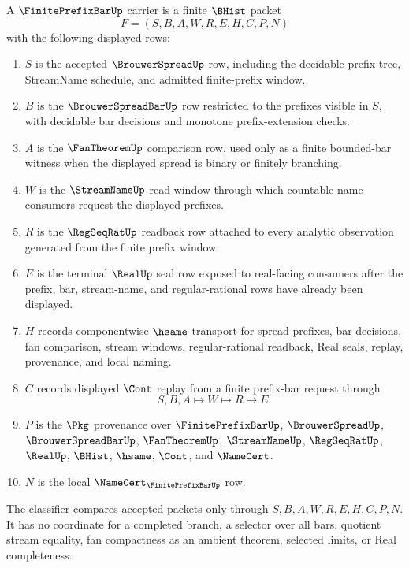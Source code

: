 \begin{definition}
\label{def:finite-prefix-bar-carrier}
A $\FinitePrefixBarUp$ carrier is a finite $\BHist$ packet
$$
F=(S,B,A,W,R,E,H,C,P,N)
$$
with the following displayed rows:
\begin{enumerate}
\item $S$ is the accepted $\BrouwerSpreadUp$ row, including the decidable prefix tree, StreamName schedule, and admitted finite-prefix window.
\item $B$ is the $\BrouwerSpreadBarUp$ row restricted to the prefixes visible in $S$, with decidable bar decisions and monotone prefix-extension checks.
\item $A$ is the $\FanTheoremUp$ comparison row, used only as a finite bounded-bar witness when the displayed spread is binary or finitely branching.
\item $W$ is the $\StreamNameUp$ read window through which countable-name consumers request the displayed prefixes.
\item $R$ is the $\RegSeqRatUp$ readback row attached to every analytic observation generated from the finite prefix window.
\item $E$ is the terminal $\RealUp$ seal row exposed to real-facing consumers after the prefix, bar, stream-name, and regular-rational rows have already been displayed.
\item $H$ records componentwise $\hsame$ transport for spread prefixes, bar decisions, fan comparison, stream windows, regular-rational readback, Real seals, replay, provenance, and local naming.
\item $C$ records displayed $\Cont$ replay from a finite prefix-bar request through
$$
S,B,A \longmapsto W \longmapsto R \longmapsto E .
$$
\item $P$ is the $\Pkg$ provenance over $\FinitePrefixBarUp$, $\BrouwerSpreadUp$, $\BrouwerSpreadBarUp$, $\FanTheoremUp$, $\StreamNameUp$, $\RegSeqRatUp$, $\RealUp$, $\BHist$, $\hsame$, $\Cont$, and $\NameCert$.
\item $N$ is the local $\NameCert_{\FinitePrefixBarUp}$ row.
\end{enumerate}
The classifier compares accepted packets only through $S,B,A,W,R,E,H,C,P,N$. It has no coordinate for a completed branch, a selector over all bars, quotient stream equality, fan compactness as an ambient theorem, selected limits, or Real completeness.
\end{definition}

